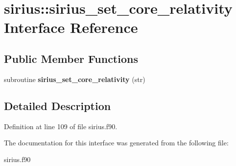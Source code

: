 \hypertarget{interfacesirius_1_1sirius__set__core__relativity}{}\section{sirius\+:\+:sirius\+\_\+set\+\_\+core\+\_\+relativity Interface Reference}
\label{interfacesirius_1_1sirius__set__core__relativity}
\subsection*{Public Member Functions}
\begin{DoxyCompactItemize}
\item 
\hypertarget{interfacesirius_1_1sirius__set__core__relativity_aaffb9423ef410a4e394b53c818cb9814}{}subroutine {\bfseries sirius\+\_\+set\+\_\+core\+\_\+relativity} (str)\label{interfacesirius_1_1sirius__set__core__relativity_aaffb9423ef410a4e394b53c818cb9814}

\end{DoxyCompactItemize}


\subsection{Detailed Description}


Definition at line 109 of file sirius.\+f90.



The documentation for this interface was generated from the following file\+:\begin{DoxyCompactItemize}
\item 
sirius.\+f90\end{DoxyCompactItemize}
